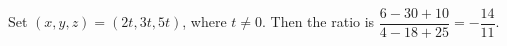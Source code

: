 Set $(x,y,z)=(2t,3t,5t)$, where $t\ne0$. Then the ratio is $\dfrac{6-30+10}{4-18+25}=\boxed{-\dfrac{14}{11}}$.
